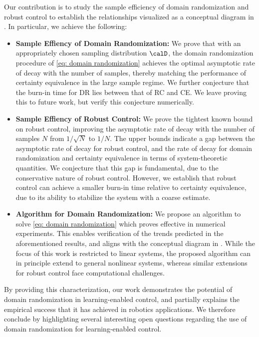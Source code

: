 Our contribution is to study the sample efficiency of domain randomization and robust control to establish the relationships visualized as a conceptual diagram in . In particular, we achieve the following: 
\begin{itemize}[noitemsep, nolistsep, leftmargin=*]
    \item \textbf{Sample Effiency of Domain Randomization:} We prove that with an appropriately chosen sampling distribution $\calD$, the domain randomization procedure of \eqref{eq: domain randomization} achieves the optimal asymptotic rate of decay with the number of samples, thereby matching the performance of certainty equivalence in the large sample regime. We further conjecture that the burn-in time for DR lies between that of RC and CE.  We leave proving this to future work, but verify this conjecture numerically.
    \item \textbf{Sample Effiency of Robust Control:} We prove the tightest known bound on robust control, improving the asymptotic rate of decay with the number of samples $N$ from $1/\sqrt{N}$ to $1/N$. The upper bounds indicate a gap between the asymptotic rate of decay for robust control, and the rate of decay for domain randomization and certainty equivalence in terms of system-theoretic quantities. We conjecture that this gap is fundamental, due to the conservative nature of robust control. However, we establish that robust control can achieve a smaller burn-in time relative to certainty equivalence, due to its ability to stabilize the system with a coarse estimate. 
    \item \textbf{Algorithm for Domain Randomization:} We propose an algorithm to solve \eqref{eq: domain randomization} which proves effective in numerical experiments. This enables verification of the trends predicted in the aforementioned results, and aligns with the conceptual diagram in . While the focus of this work is restricted to linear systems, the proposed algorithm can in principle extend to general nonlinear systems, whereas similar extensions for robust control face computational challenges.  
\end{itemize}
By providing this characterization, our work demonstrates the potential of domain randomization in learning-enabled control, and partially explains the empirical success that it has achieved in robotics applications. We therefore conclude by highlighting several interesting open questions regarding the use of domain randomization for learning-enabled control. 

